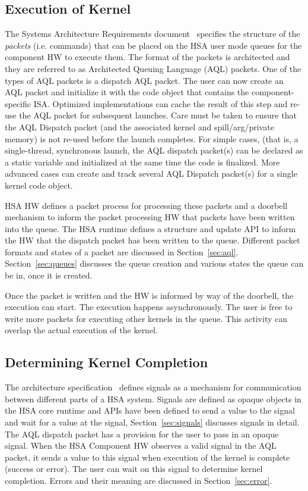 \documentclass[final]{book}
\begin{document}
\subsection{Execution of Kernel}
The Systems Architecture Requirements document~\cite{sar} specifies the
structure of the \emph{packets} (i.e. commands) that can be placed on the HSA
user mode queues for the component HW to execute them. The format of the packets
is architected and they are referred to as Architected Queuing Language (AQL)
packets. One of the types of AQL packets is a dispatch AQL packet. The user can
now create an AQL packet and initialize it with the code object that contains
the component-specific ISA. 
Optimized implementations can cache the result of this step and re-use the AQL
packet for subsequent launches. Care must be taken to ensure that the AQL
Dispatch packet (and the associated kernel and spill/arg/private memory) is not
re-used before the launch completes. For simple cases, (that is, a
single-thread, synchronous launch, the AQL dispatch packet(s) can be declared
as a static variable and initialized at the same time the code is
finalized. More advanced cases can create and track several AQL Dispatch
packet(s) for a single kernel code object.

HSA HW defines a packet process for processing these packets and a doorbell
mechanism to inform the packet processing HW that packets have been written into
the queue. The HSA runtime defines a structure and update API to inform the HW
that the dispatch packet has been written to the queue. Different packet formats
and states of a packet are discussed in
Section~\ref{sec:aql}. Section~\ref{sec:queues} discusses the queue creation
and various states the queue can be in, once it is created.

Once the packet is written and the HW is informed by way of the doorbell, the
execution can start. The execution happens asynchronously. The user is free to
write more packets for executing other kernels in the queue. This activity can
overlap the actual execution of the kernel.

\subsection{Determining Kernel Completion}
The architecture specification~\cite{sar} defines signals as a mechanism for
communication between different parts of a HSA system. Signals are defined as
opaque objects in the HSA core runtime and APIs have been defined to send a
value to the signal and wait for a value at the signal,
Section~\ref{sec:signals} discusses signals in detail. The AQL dispatch packet
has a provision for the user to pass in an opaque signal. When the HSA Component
HW observes a valid signal in the AQL packet, it sends a value to this signal
when execution of the kernel is complete (success or error). The user can wait
on this signal to determine kernel completion. Errors and their meaning are
discussed in Section~\ref{sec:error}.
\end{document}
